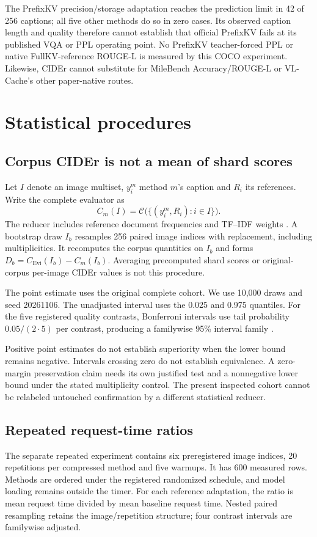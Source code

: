 \documentclass{article}
\begin{document}
The PrefixKV precision/storage adaptation reaches the prediction limit in
42 of 256 captions; all five other methods do so in zero cases.
Its observed caption length and quality therefore cannot establish that
official PrefixKV fails at its published VQA or PPL operating point. No
PrefixKV teacher-forced PPL or native FullKV-reference ROUGE-L is measured
by this COCO experiment. Likewise, CIDEr cannot substitute for MileBench
Accuracy/ROUGE-L or VL-Cache's other paper-native routes.

\section{Statistical procedures}
\subsection{Corpus CIDEr is not a mean of shard scores}
Let $I$ denote an image multiset, $y^m_i$ method $m$'s caption and
$R_i$ its references. Write the complete evaluator as
\begin{equation}
 C_m(I)=\mathcal C\bigl(\{(y^m_i,R_i):i\in I\}\bigr).
\end{equation}
The reducer includes reference document frequencies and TF--IDF weights
\citep{vedantam2015cider}. A bootstrap draw $I_b$ resamples 256 paired
image indices with replacement, including multiplicities. It recomputes
the corpus quantities on $I_b$ and forms
$D_b=C_{\mathrm{Evi}}(I_b)-C_m(I_b)$. Averaging precomputed shard scores
or original-corpus per-image CIDEr values is not this procedure.

The point estimate uses the original complete cohort. We use 10,000 draws
and seed 20261106. The unadjusted interval uses the 0.025 and 0.975
quantiles. For the five registered quality contrasts, Bonferroni intervals
use tail probability $0.05/(2\cdot5)$ per contrast, producing a familywise
95\% interval family \citep{efron1979bootstrap}.

Positive point estimates do not establish superiority when the lower
bound remains negative. Intervals crossing zero do not establish
equivalence. A zero-margin preservation claim needs its own justified
test and a nonnegative lower bound under the stated multiplicity control.
The present inspected cohort cannot be relabeled untouched confirmation
by a different statistical reducer.

\subsection{Repeated request-time ratios}
The separate repeated experiment contains six preregistered image indices,
20 repetitions per compressed method and five warmups. It has 600 measured
rows. Methods are ordered under the registered randomized schedule, and
model loading remains outside the timer. For each reference adaptation,
the ratio is mean \Evi{} request time divided by mean baseline request
time. Nested paired resampling retains the image/repetition structure;
four contrast intervals are familywise adjusted.
\end{document}
